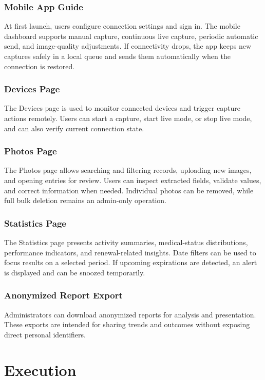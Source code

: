 \documentclass[12pt,a4paper]{article}
\begin{document}
\subsubsection{Mobile App Guide}
At first launch, users configure connection settings and sign in. The mobile
dashboard supports manual capture, continuous live capture, periodic automatic
send, and image-quality adjustments. If connectivity drops, the app keeps new
captures safely in a local queue and sends them automatically when the
connection is restored.

\subsubsection{Devices Page}
The Devices page is used to monitor connected devices and trigger capture
actions remotely. Users can start a capture, start live mode, or stop live
mode, and can also verify current connection state.

\subsubsection{Photos Page}
The Photos page allows searching and filtering records, uploading new images,
and opening entries for review. Users can inspect extracted fields, validate
values, and correct information when needed. Individual photos can be removed,
while full bulk deletion remains an admin-only operation.

\subsubsection{Statistics Page}
The Statistics page presents activity summaries, medical-status distributions,
performance indicators, and renewal-related insights. Date filters can be used
to focus results on a selected period. If upcoming expirations are detected, an
alert is displayed and can be snoozed temporarily.

\subsubsection{Anonymized Report Export}
Administrators can download anonymized reports for analysis and presentation.
These exports are intended for sharing trends and outcomes without exposing
direct personal identifiers.



\section{Execution}
\end{document}

